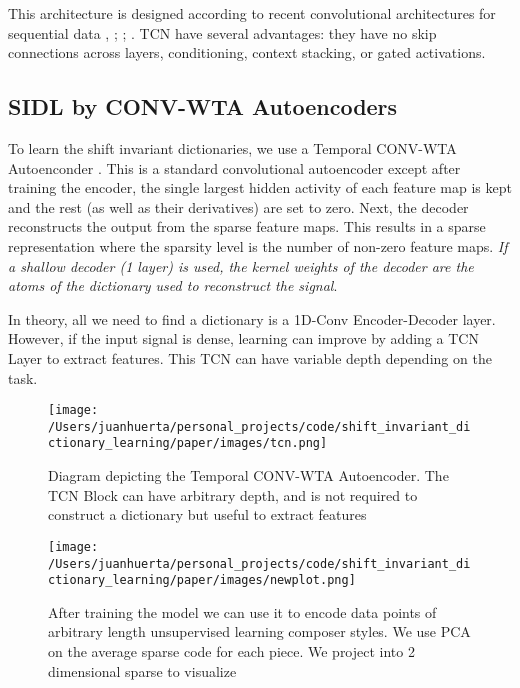 \documentclass[11pt,a4paper]{article}
\begin{document}
This architecture is designed according to recent convolutional architectures for sequential data \cite{oord2016wavenet},
\cite{kalchbrenner2017neural} ; \cite{DBLP:journals/corr/DauphinFAG16}; \cite{Zheng2016}. TCN have several advantages: they have no skip connections across layers, conditioning, context stacking, or gated activations.


\subsection{SIDL by CONV-WTA Autoencoders}
To learn the shift invariant dictionaries, we use a Temporal CONV-WTA Autoenconder \cite{DBLP:journals/corr/MakhzaniF14}. This is a standard convolutional autoencoder except after training the encoder, the single largest hidden activity of each feature map is kept and the rest (as well as their derivatives) are set to zero. Next, the decoder reconstructs the output from the sparse feature maps. This results in a sparse representation where the sparsity level is the number of non-zero feature maps. \emph{If a shallow decoder (1 layer) is used, the kernel weights of the decoder are the atoms of the dictionary used to reconstruct the signal}. 

In theory, all we need to find a dictionary is a 1D-Conv Encoder-Decoder layer. However, if the input signal is dense, learning can improve by adding a TCN Layer to extract features. This TCN can have variable depth depending on the task.

\begin{figure}[ht]
  \texttt{[image: /Users/juanhuerta/personal\_projects/code/shift\_invariant\_dictionary\_learning/paper/images/tcn.png]}
  \caption{Diagram depicting the Temporal CONV-WTA Autoencoder. The TCN Block can have arbitrary depth, and is not required to construct a dictionary but useful to extract features}
  \label{fig:boat1}
\end{figure}

\begin{figure*}[ht]
  \texttt{[image: /Users/juanhuerta/personal\_projects/code/shift\_invariant\_dictionary\_learning/paper/images/newplot.png]}
  \caption{After training the model we can use it to encode data points of arbitrary length unsupervised learning composer styles. We use PCA on the average sparse code for each piece. We project into 2 dimensional sparse to visualize }
    \label{fig:boat1}
\end{figure*}
\end{document}
